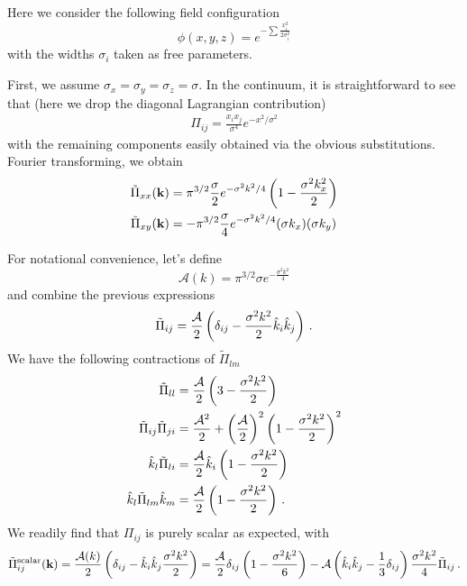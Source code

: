 \documentclass{revtex4}
\begin{document}
Here we consider the following field configuration
\begin{equation}
  \phi(x,y,z) = e^{-\sum\frac{x_i^2}{2\sigma_i^2}}
\end{equation}
with the widths $\sigma_i$ taken as free parameters.

First, we assume $\sigma_x=\sigma_y=\sigma_z=\sigma$.
In the continuum, it is straightforward to see that (here we drop the diagonal Lagrangian contribution)
\begin{subequations}
\begin{align}
  \Pi_{ij} = \frac{x_ix_j}{\sigma^4}e^{-x^2/\sigma^2}
\end{align}
\end{subequations}
with the remaining components easily obtained via the obvious substitutions.
Fourier transforming, we obtain
\begin{align}
  \tilde{\Pi}_{xx}({\bf k}) &= \pi^{3/2}\frac{\sigma}{2}e^{-\sigma^2k^2/4}\left(1-\frac{\sigma^2k_x^2}{2}\right) \\
  \tilde{\Pi}_{xy}({\bf k}) &= -\pi^{3/2}\frac{\sigma}{4}e^{-\sigma^2k^2/4}(\sigma k_x)(\sigma k_y)
\end{align}

For notational convenience, let's define
\begin{equation}
  \mathcal{A}(k) = \pi^{3/2}\sigma e^{-\frac{\sigma^2k^2}{4}}
\end{equation}
and combine the previous expressions
\begin{equation}
  \tilde{\Pi}_{ij} = \frac{\mathcal{A}}{2}\left(\delta_{ij} - \frac{\sigma^2k^2}{2}\hat{k}_i\hat{k}_j\right) \, .
\end{equation}
We have the following contractions of $\tilde{\Pi}_{lm}$
\begin{subequations}
\begin{align}
  \tilde{\Pi}_{ll} &= \frac{\mathcal{A}}{2}\left(3-\frac{\sigma^2k^2}{2}\right) \\
  \tilde{\Pi}_{ij}\tilde{\Pi}_{ji} &= \frac{\mathcal{A}^2}{2} + \left(\frac{\mathcal{A}}{2}\right)^2\left(1-\frac{\sigma^2k^2}{2}\right)^2 \\
  \hat{k}_l\tilde{\Pi}_{li} &= \frac{\mathcal{A}}{2}\hat{k}_i\left(1-\frac{\sigma^2k^2}{2}\right) \\
  \hat{k}_l\tilde{\Pi}_{lm}\hat{k}_m &= \frac{\mathcal{A}}{2}\left(1-\frac{\sigma^2k^2}{2}\right) \, .
\end{align}
\end{subequations}
We readily find that $\Pi_{ij}$ is purely scalar as expected, with
\begin{equation}
  \tilde{\Pi}_{ij}^{{\rm scalar}}({\bf k}) = \frac{\mathcal{A}(k)}{2}\left(\delta_{ij}-\hat{k}_i\hat{k}_j\frac{\sigma^2k^2}{2}\right) = \frac{\mathcal{A}}{2}\delta_{ij}\left(1-\frac{\sigma^2k^2}{6}\right) - \mathcal{A}\left(\hat{k}_i\hat{k}_j-\frac{1}{3}\delta_{ij}\right)\frac{\sigma^2 k^2}{4} \tilde{\Pi}_{ij} \, .
\end{equation}
\end{document}
